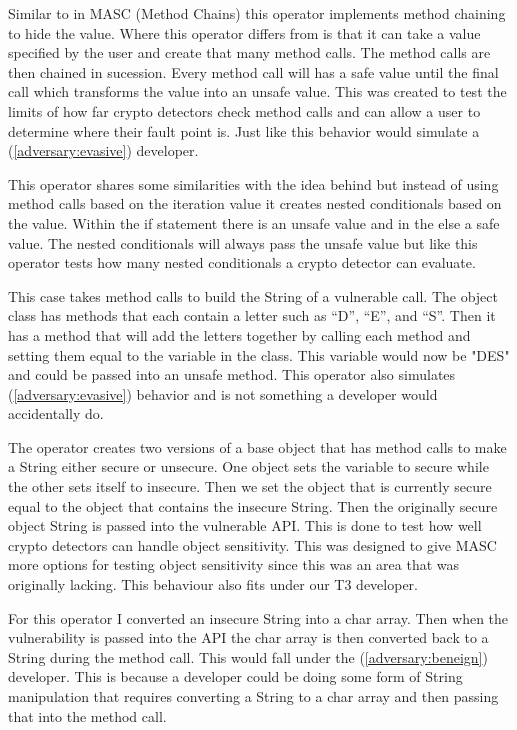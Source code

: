  Similar to in MASC  (Method Chains) this operator implements method chaining to hide the value. Where this operator differs from  is that it can take a value specified by the user and create that many method calls. The method calls are then chained in sucession. Every method call will has a safe value until the final call which transforms the value into an unsafe value. This was created to test the limits of how far crypto detectors check method calls and can allow a user to determine where their fault point is. Just like  this behavior would simulate a (\ref{adversary:evasive}) developer.

 This operator shares some similarities with the idea behind  but instead of using method calls based on the iteration value it creates nested conditionals based on the value. Within the if statement there is an unsafe value and in the else a safe value. The nested conditionals will always pass the unsafe value but like  this operator tests how many nested conditionals a crypto detector can evaluate.

 This case takes method calls to build the String of a vulnerable call. The object class has methods that each contain a letter such as “D”, “E”, and “S”. Then it has a method that will add the letters together by calling each method and setting them equal to the variable in the class. This variable would now be "DES" and could be passed into an unsafe method. This operator also simulates (\ref{adversary:evasive}) behavior and is not something a developer would accidentally do. 

 The operator creates two versions of a base object that has method calls to make a String either secure or unsecure. One object sets the variable to secure while the other sets itself to insecure. Then we set the object that is currently secure equal to the object that contains the insecure String. Then the originally secure object String is passed into the vulnerable API. This is done to test how well crypto detectors can handle object sensitivity. This was designed to give MASC more options for testing object sensitivity since this was an area that was originally lacking. This behaviour also fits under our T3 developer.

 For this operator I converted an insecure String into a char array. Then when the vulnerability is passed into the API the char array is then converted back to a String during the method call. This would fall under the (\ref{adversary:beneign}) developer. This is because a developer could be doing some form of String manipulation that requires converting a String to a char array and then passing that into the method call. 

